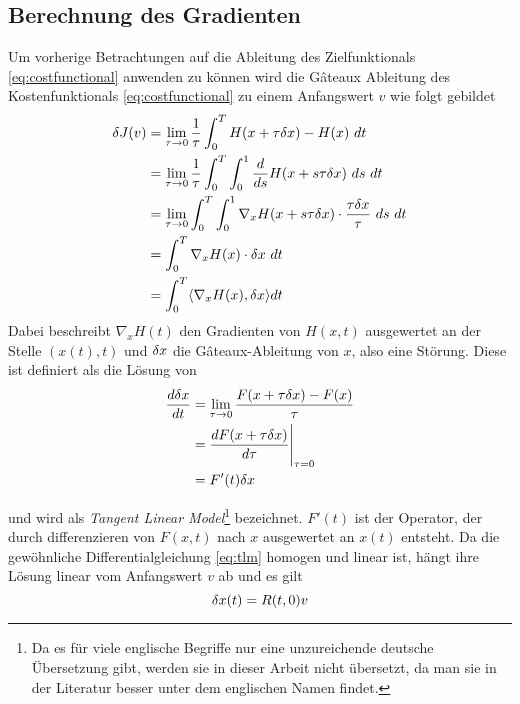 \subsection{Berechnung des Gradienten}
Um vorherige Betrachtungen auf die Ableitung des Zielfunktionals \eqref{eq:costfunctional} anwenden zu können wird die Gâteaux Ableitung des Kostenfunktionals \eqref{eq:costfunctional} zu einem Anfangswert $v$ wie folgt gebildet
\begin{equation}
\label{eq:gatcost}
\begin{aligned}
 \delta J(v)  &= \lim_{\tau\to 0} \frac{1}{\tau}\int_0^T H(x+\tau\delta x)-H(x)~ dt\\
	    &= \lim_{\tau\to 0} \frac{1}{\tau}\int_0^T \int_0^1 \frac{d}{ds}H(x+s\tau\delta x) ~ds~ dt\\
	    &= \lim_{\tau\to 0} \int_0^T \int_0^1 \nabla_x H(x+s\tau\delta x)\cdot \frac{\tau \delta x}{\tau} ~ds ~dt\\
	    &= \int_0^T \nabla_x H(x)\cdot \delta x~ dt\\
	    &= \int_0^T \langle \nabla_x H(x), \delta x \rangle dt\\  
\end{aligned}
\end{equation}
Dabei beschreibt $\nabla_x H(t)$ den Gradienten von $H(x,t)$ ausgewertet an der Stelle $(x(t),t)$ und $\delta x$ die Gâteaux-Ableitung von $x$, also eine Störung. Diese ist definiert als die Lösung von
\begin{equation}
\label{eq:tlm}
\begin{aligned}
  \frac{d \delta x}{dt} &= \lim_{\tau\to 0}\frac{F(x+\tau \delta x)-F(x)}{\tau}\\
			 &= \frac{d F(x+\tau\delta x)}{d\tau} \Bigg\rvert_{\tau=0}\\
			 &= F'(t)\delta x
\end{aligned} 
\end{equation}

und wird als \textit{Tangent Linear Model}\footnote{Da es für viele englische Begriffe nur eine unzureichende deutsche Übersetzung gibt, werden sie in dieser Arbeit nicht übersetzt, da man sie in der Literatur besser unter dem englischen Namen findet.} bezeichnet. $F'(t)$ ist der Operator, der durch differenzieren von $F(x,t)$ nach $x$ ausgewertet an $x(t)$ entsteht. Da die gewöhnliche Differentialgleichung \eqref{eq:tlm} homogen und linear ist, hängt ihre Lösung linear vom Anfangswert $v$ ab und es gilt
\begin{equation}
\label{eq:resolvent}
 \delta x(t) = R(t,0)v
\end{equation}

